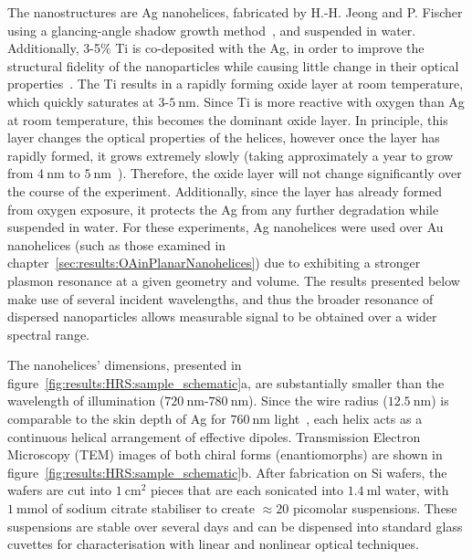 The nanostructures are Ag nanohelices, fabricated by H.-H. Jeong and P. Fischer using a glancing-angle shadow growth method~\cite{Gibbs2014}, and suspended in water. 
Additionally, 3-5$\%$ Ti is co-deposited with the Ag, in order to improve the structural fidelity of the nanoparticles while causing little change in their optical properties~\cite{Larsen2014b}. The Ti results in a rapidly forming oxide layer at room temperature, which quickly saturates at 3-$\SI{5}{\nano\m}$. Since Ti is more reactive with oxygen than Ag at room temperature, this becomes the dominant oxide layer. 
In principle, this layer changes the optical properties of the helices, however once the layer has rapidly formed, it grows extremely slowly (taking approximately a year to grow from $\SI{4}{\nano\m}$ to $\SI{5}{\nano\m}$~\cite[\S 7.3]{Brunette2001}). 
Therefore, the oxide layer will not change significantly over the course of the experiment. Additionally, since the layer has already formed from oxygen exposure, it protects the Ag from any further degradation while suspended in water.
For these experiments, Ag nanohelices were used over Au nanohelices (such as those examined in chapter~\ref{sec:results:OAinPlanarNanohelices}) due to exhibiting a stronger plasmon resonance at a given geometry and volume. The results presented below make use of several incident wavelengths, and thus the broader resonance of dispersed nanoparticles allows measurable signal to be obtained over a wider spectral range.

The nanohelices' dimensions, presented in figure~\ref{fig:results:HRS:sample_schematic}a, are substantially smaller than the wavelength of illumination ($\SI{720}{\nano\m}$-$\SI{780}{\nano\m}$). Since the wire radius ($\SI{12.5}{\nano\m}$) is comparable to the skin depth of Ag for $\SI{760}{\nano\m}$ light~\cite{Johnson1972}, each helix acts as a continuous helical arrangement of effective dipoles. Transmission Electron Microscopy (TEM) images of both chiral forms (enantiomorphs) are shown in figure~\ref{fig:results:HRS:sample_schematic}b. 
After fabrication on Si wafers, the wafers are cut into $\SI{1}{\centi\meter\squared}$ pieces that are each sonicated into $\SI{1.4}{\milli\litre}$ water, with $\SI{1}{\milli\mole}$ of sodium citrate stabiliser to create $\approx 20$ picomolar suspensions. These suspensions are stable over several days and can be dispensed into standard glass cuvettes for characterisation with linear and nonlinear optical techniques.  

